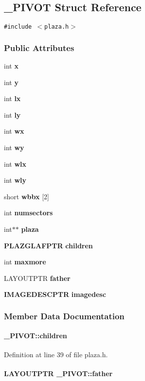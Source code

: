 \subsection{\_\-PIVOT  Struct Reference}
\label{_PIVOT}
{\tt \#include $<$plaza.h$>$}

\subsubsection*{Public Attributes}
\begin{CompactItemize}
\item 
int {\bf x}
\item 
int {\bf y}
\item 
int {\bf lx}
\item 
int {\bf ly}
\item 
int {\bf wx}
\item 
int {\bf wy}
\item 
int {\bf wlx}
\item 
int {\bf wly}
\item 
short {\bf wbbx} [2]
\item 
int {\bf numsectors}
\item 
int$\ast$$\ast$ {\bf plaza}
\item 
{\bf PLAZGLAFPTR} {\bf children}
\item 
int {\bf maxmore}
\item 
LAYOUTPTR {\bf father}
\item 
{\bf IMAGEDESCPTR} {\bf imagedesc}
\end{CompactItemize}


\subsubsection{Member Data Documentation}
\label{_PIVOT_m11}
\paragraph{ \_\-PIVOT::children}\hfill



Definition at line 39 of file plaza.h.\label{_PIVOT_m13}
\paragraph{\setlength{\rightskip}{0pt plus 5cm}LAYOUTPTR \_\-PIVOT::father}\hfill



